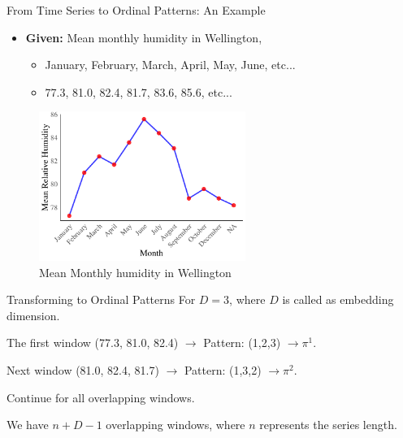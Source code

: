 \documentclass{beamer}
\begin{document}
\begin{frame}{From Time Series to Ordinal Patterns: An Example}
	\begin{itemize}
		\item \textbf{Given:} Mean monthly humidity in Wellington,
		\begin{itemize}
			\item January, February, March, April, May, June, etc...
			\item 77.3, 81.0, 82.4, 81.7, 83.6, 85.6, etc... 
		\end{itemize}
	\end{itemize}
\begin{figure}[hbt]
	\centering
	\includegraphics[width=0.6\textwidth]{humidity graph}
	\caption{Mean Monthly humidity in Wellington}
	\label{fig:humidity}
\end{figure}	
	
\end{frame}

\begin{frame}{Transforming to Ordinal Patterns}
	For $D=3$, where $D$ is called as \alert{embedding dimension}.
	
	The first window (77.3, 81.0, 82.4) $\rightarrow$ Pattern: (1,2,3) $\rightarrow \pi^1$.
	
	Next window (81.0, 82.4, 81.7) $\rightarrow$ Pattern: (1,3,2) $\rightarrow \pi^2$.
	
	Continue for all overlapping windows.
	
	We have $n+D-1$ overlapping windows, where $n$ represents the series length. 
\end{frame}

\end{document}
